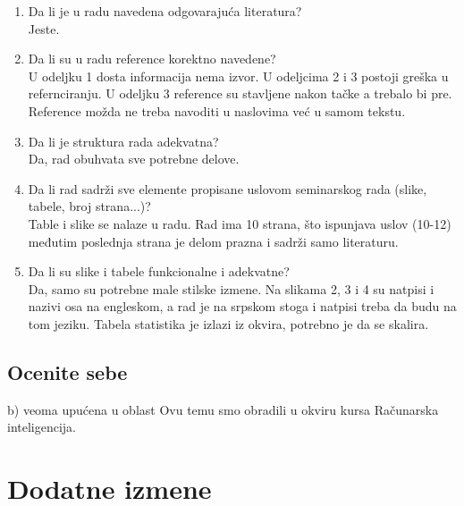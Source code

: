 \documentclass[a4paper]{report}
\begin{document}
\begin{enumerate}
	\item Da li je u radu navedena odgovarajuća literatura?\\ Jeste.
	\item Da li su u radu reference korektno navedene?\\
	U odeljku 1 dosta informacija nema izvor.\newline
	U odeljcima 2 i 3 postoji greška u refernciranju.\newline
	U odeljku 3 reference su stavljene nakon tačke a trebalo bi pre.\newline
	Reference možda ne treba navoditi u naslovima već u samom tekstu.
	\item Da li je struktura rada adekvatna?\\
	Da, rad obuhvata sve potrebne delove.
	\item Da li rad sadrži sve elemente propisane uslovom seminarskog rada (slike, tabele, broj strana...)?\\ 
	Table i slike se nalaze u radu. \newline
	Rad ima 10 strana, što ispunjava uslov (10-12) međutim poslednja strana je delom prazna i sadrži samo literaturu.
	\item Da li su slike i tabele funkcionalne i adekvatne?\\
	Da, samo su potrebne male stilske izmene. \newline
	Na slikama 2, 3 i 4 su natpisi i nazivi osa na engleskom, a rad je na srpskom stoga i natpisi treba da budu na tom jeziku.\newline
	Tabela statistika je izlazi iz okvira, potrebno je da se skalira.
	
\end{enumerate} 
\section{Ocenite sebe}
b) veoma upućena u oblast \newline
Ovu temu smo obradili u okviru kursa Računarska inteligencija.

\chapter{Dodatne izmene}
\end{document}
